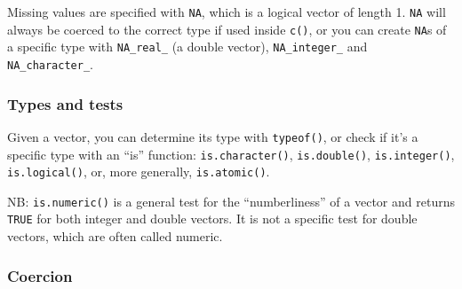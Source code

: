 Missing values are specified with \texttt{NA}, which is a logical vector
of length 1. \texttt{NA} will always be coerced to the correct type if
used inside \texttt{c()}, or you can create \texttt{NA}s of a specific
type with \texttt{NA\_real\_} (a double vector), \texttt{NA\_integer\_}
and \texttt{NA\_character\_}. 

\subsubsection{Types and tests}

Given a vector, you can determine its type with \texttt{typeof()}, or
check if it's a specific type with an ``is'' function:
\texttt{is.character()}, \texttt{is.double()}, \texttt{is.integer()},
\texttt{is.logical()}, or, more generally, \texttt{is.atomic()}.

\begin{Shaded}
\begin{Highlighting}[]
\StringTok{ }

\StringTok{ }\NormalTok{(}\NormalTok{, }\NormalTok{, }\NormalTok{)}
\end{Highlighting}
\end{Shaded}

NB: \texttt{is.numeric()} is a general test for the ``numberliness'' of
a vector and returns \texttt{TRUE} for both integer and double vectors.
It is not a specific test for double vectors, which are often called
numeric. 

\begin{Shaded}
\begin{Highlighting}[]
\end{Highlighting}
\end{Shaded}

\subsubsection{Coercion}

